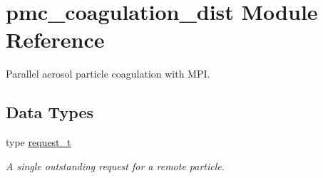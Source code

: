 \hypertarget{namespacepmc__coagulation__dist}{}\section{pmc\+\_\+coagulation\+\_\+dist Module Reference}
\label{namespacepmc__coagulation__dist}


Parallel aerosol particle coagulation with M\+PI.  


\subsection*{Data Types}
\begin{DoxyCompactItemize}
\item 
type \mbox{\hyperlink{structpmc__coagulation__dist_1_1request__t}{request\+\_\+t}}
\begin{DoxyCompactList}\small\item\em A single outstanding request for a remote particle. \end{DoxyCompactList}\end{DoxyCompactItemize}
